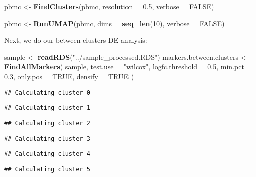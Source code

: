 \documentclass[
]{article}
\newenvironment{Shaded}{\begin{snugshade}}{\end{snugshade}}
\newcommand{\AttributeTok}[1]{\textcolor[rgb]{0.13,0.29,0.53}{#1}}
\newcommand{\ConstantTok}[1]{\textcolor[rgb]{0.56,0.35,0.01}{#1}}
\newcommand{\DecValTok}[1]{\textcolor[rgb]{0.00,0.00,0.81}{#1}}
\newcommand{\FloatTok}[1]{\textcolor[rgb]{0.00,0.00,0.81}{#1}}
\newcommand{\FunctionTok}[1]{\textcolor[rgb]{0.13,0.29,0.53}{\textbf{#1}}}
\newcommand{\NormalTok}[1]{#1}
\newcommand{\OtherTok}[1]{\textcolor[rgb]{0.56,0.35,0.01}{#1}}
\newcommand{\StringTok}[1]{\textcolor[rgb]{0.31,0.60,0.02}{#1}}
\begin{document}
\begin{Shaded}
\begin{Highlighting}[]
\NormalTok{pbmc }\OtherTok{\textless{}{-}} \FunctionTok{FindClusters}\NormalTok{(pbmc, }\AttributeTok{resolution =} \FloatTok{0.5}\NormalTok{, }\AttributeTok{verbose =} \ConstantTok{FALSE}\NormalTok{)}

\NormalTok{pbmc }\OtherTok{\textless{}{-}} \FunctionTok{RunUMAP}\NormalTok{(pbmc, }\AttributeTok{dims =} \FunctionTok{seq\_len}\NormalTok{(}\DecValTok{10}\NormalTok{), }\AttributeTok{verbose =} \ConstantTok{FALSE}\NormalTok{)}
\end{Highlighting}
\end{Shaded}

Next, we do our between-clusters DE analysis:

\begin{Shaded}
\begin{Highlighting}[]
\NormalTok{sample }\OtherTok{\textless{}{-}} \FunctionTok{readRDS}\NormalTok{(}\StringTok{"../sample\_processed.RDS"}\NormalTok{)}
\NormalTok{markers.between.clusters }\OtherTok{\textless{}{-}} \FunctionTok{FindAllMarkers}\NormalTok{(}
\NormalTok{  sample,}
  \AttributeTok{test.use =} \StringTok{"wilcox"}\NormalTok{,}
  \AttributeTok{logfc.threshold =} \FloatTok{0.5}\NormalTok{,}
  \AttributeTok{min.pct =} \FloatTok{0.3}\NormalTok{,}
  \AttributeTok{only.pos =} \ConstantTok{TRUE}\NormalTok{,}
  \AttributeTok{densify =} \ConstantTok{TRUE}
\NormalTok{)}
\end{Highlighting}
\end{Shaded}

\begin{verbatim}
## Calculating cluster 0
\end{verbatim}

\begin{verbatim}
## Calculating cluster 1
\end{verbatim}

\begin{verbatim}
## Calculating cluster 2
\end{verbatim}

\begin{verbatim}
## Calculating cluster 3
\end{verbatim}

\begin{verbatim}
## Calculating cluster 4
\end{verbatim}

\begin{verbatim}
## Calculating cluster 5
\end{verbatim}
\end{document}
